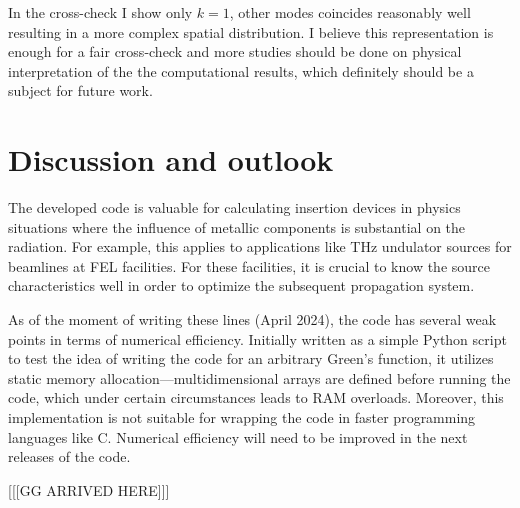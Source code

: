     In the cross-check I show only $k=1$, other modes coincides reasonably well resulting in a more complex spatial distribution. I believe this representation is enough for a fair cross-check and more studies should be done on physical interpretation of the the computational results, which definitely should be a subject for future work.
    
\section{Discussion and outlook}
    
    The developed code is valuable for calculating insertion devices in physics situations where the influence of metallic components is substantial on the radiation. For example, this applies to applications like THz undulator sources for beamlines at FEL facilities. For these facilities, it is crucial to know the source characteristics well in order to optimize the subsequent propagation system.

    As of the moment of writing these lines (April 2024), the code has several weak points in terms of numerical efficiency. Initially written as a simple Python script to test the idea of writing the code for an arbitrary Green's function, it utilizes static memory allocation—multidimensional arrays are defined before running the code, which under certain circumstances leads to RAM overloads. Moreover, this implementation is not suitable for wrapping the code in faster programming languages like C. Numerical efficiency will need to be improved in the next releases of the code.

[[[GG ARRIVED HERE]]]